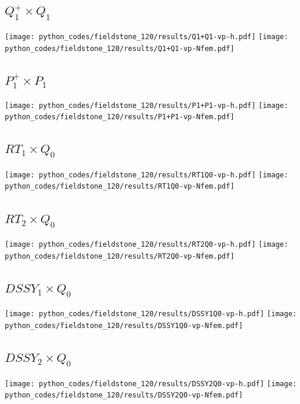 \subsection*{$Q_1^+\times Q_1$}
\begin{center}
\texttt{[image: python\_codes/fieldstone\_120/results/Q1+Q1-vp-h.pdf]}
\texttt{[image: python\_codes/fieldstone\_120/results/Q1+Q1-vp-Nfem.pdf]}
\end{center}

\subsection*{$P_1^+\times P_1$}
\begin{center}
\texttt{[image: python\_codes/fieldstone\_120/results/P1+P1-vp-h.pdf]}
\texttt{[image: python\_codes/fieldstone\_120/results/P1+P1-vp-Nfem.pdf]}
\end{center}

\subsection*{$RT_1\times Q_0$}
\begin{center}
\texttt{[image: python\_codes/fieldstone\_120/results/RT1Q0-vp-h.pdf]}
\texttt{[image: python\_codes/fieldstone\_120/results/RT1Q0-vp-Nfem.pdf]}
\end{center}

\subsection*{$RT_2\times Q_0$}
\begin{center}
\texttt{[image: python\_codes/fieldstone\_120/results/RT2Q0-vp-h.pdf]}
\texttt{[image: python\_codes/fieldstone\_120/results/RT2Q0-vp-Nfem.pdf]}
\end{center}

\subsection*{$DSSY_1\times Q_0$}
\begin{center}
\texttt{[image: python\_codes/fieldstone\_120/results/DSSY1Q0-vp-h.pdf]}
\texttt{[image: python\_codes/fieldstone\_120/results/DSSY1Q0-vp-Nfem.pdf]}
\end{center}

\subsection*{$DSSY_2\times Q_0$}
\begin{center}
\texttt{[image: python\_codes/fieldstone\_120/results/DSSY2Q0-vp-h.pdf]}
\texttt{[image: python\_codes/fieldstone\_120/results/DSSY2Q0-vp-Nfem.pdf]}
\end{center}

